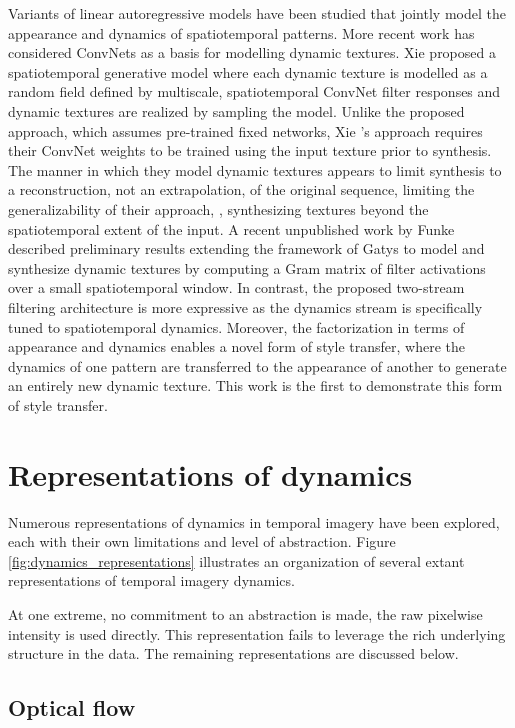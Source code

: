 Variants of linear autoregressive models have been studied
\cite{szummer1996,doretto2003,wang2003,fitzgibbon2001} that jointly model the appearance and
dynamics of spatiotemporal patterns.
More recent work has considered ConvNets as a basis for modelling 
dynamic textures.
Xie \etal \cite{xie2017synthesizing} proposed a spatiotemporal
generative model where each dynamic texture is modelled as a random
field defined by multiscale, spatiotemporal ConvNet filter responses
and dynamic textures are realized by sampling the model.
Unlike the proposed approach, which assumes pre-trained fixed networks,
Xie \etal's \cite{xie2017synthesizing} approach requires their ConvNet weights to be trained using the input texture prior to synthesis. The manner in which they model dynamic textures appears to limit synthesis to a reconstruction, not an extrapolation, of the original sequence, limiting the generalizability of their approach, \eg, synthesizing textures beyond the spatiotemporal extent of the input.
A recent unpublished work by Funke \etal \cite{funke2017} described preliminary 
results extending the framework of Gatys \etal \cite{gatys2015} 
to model and  synthesize dynamic textures by computing a Gram 
matrix of filter activations over a small spatiotemporal window.
In contrast, the proposed two-stream filtering architecture is more 
expressive as the dynamics stream is specifically tuned to 
spatiotemporal dynamics.
Moreover, the factorization
in terms of appearance and dynamics enables a novel form of
style transfer, where the dynamics of one pattern are 
transferred to the appearance of another to generate an
entirely new dynamic texture.
This work is the first to demonstrate this form of style transfer.


\section{Representations of dynamics}

Numerous representations of dynamics in temporal imagery have been explored, each with their own limitations and level of abstraction. Figure \ref{fig:dynamics_representations} illustrates an organization of several extant representations of temporal imagery dynamics.

At one extreme, no commitment to an abstraction is made, the raw pixelwise intensity is used directly. This representation fails to leverage the rich underlying structure in the data. The remaining representations are discussed below.

\subsection{Optical flow}


